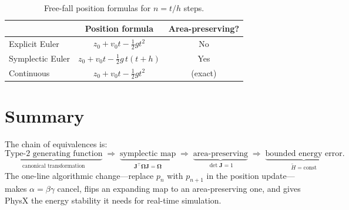 \documentclass[11pt]{article}
\newcommand{\J}{\mathbf{J}}          %
\newcommand{\Omg}{\boldsymbol{\Omega}} %
\begin{document}
\begin{table}[h]
  \centering
  \begin{tabular}{lcc}
    \toprule
    & Position formula & Area-preserving?\\
    \midrule
    Explicit Euler   & $z_0 + v_0 t - \frac{1}{2}g t^2$ & No\\
    Symplectic Euler & $z_0 + v_0 t - \frac{1}{2}g\,t(t+h)$ & Yes\\
    Continuous       & $z_0 + v_0 t - \frac{1}{2}g t^2$  & (exact)\\
    \bottomrule
  \end{tabular}
  \caption{Free-fall position formulas for $n = t/h$ steps.}
\end{table}

\section{Summary}

The chain of equivalences is:
\[
  \underbrace{\text{Type-2 generating function}}_{\text{canonical transformation}}
  \;\Rightarrow\;
  \underbrace{\text{symplectic map}}_{\J^{\top}\Omg\J = \Omg}
  \;\Rightarrow\;
  \underbrace{\text{area-preserving}}_{\det \J = 1}
  \;\Rightarrow\;
  \underbrace{\text{bounded energy error}}_{\tilde H = \text{const}}.
\]
The one-line algorithmic change---replace $p_n$ with $p_{n+1}$ in the
position update---makes $\alpha = \beta\gamma$ cancel, flips an expanding
map to an area-preserving one, and gives PhysX the energy stability it needs
for real-time simulation.
\end{document}
